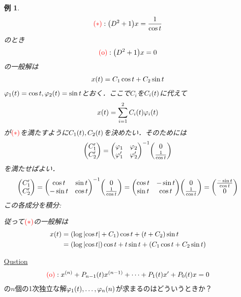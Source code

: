 \documentclass[autodetect-engine,dvipdfmx-if-dvi,ja=standard]{bxjsarticle}
\theoremstyle{mystyle1}
\theoremstyle{mystyle2}
\newtheorem{example}{例}
\newcommand{\redast}{\ensuremath{\color{red}\qty(\ast)\color{black}}}
\newcommand{\redo}{\ensuremath{\color{red}\qty(\textrm{o})\color{black}}}
\begin{document}
\begin{example}
  \begin{align*}
    \redast:\qty(D^2+1)x=\frac{1}{\cos t}
  \end{align*}のとき\begin{align*}
    \redo:\qty(D^2+1)x=0
  \end{align*}の一般解は\begin{align*}
    x\qty(t)=C_1\cos t+C_2\sin t
  \end{align*}$\varphi_1\qty(t)=\cos t,\varphi_2\qty(t)=\sin t$とおく．ここで$C_i$を$C_i\qty(t)$に代えて\begin{align*}
    x\qty(t)=\sum_{i=1}^2C_i\qty(t)\varphi_i\qty(t)
  \end{align*}が\redast を満たすように$C_1\qty(t),C_2\qty(t)$を決めたい．そのためには
  \[\mqty(C_1^\prime  \\C_2^\prime )=\mqty(
    \varphi_1  & \varphi_2  \\
    \varphi_1^\prime & \varphi_2^\prime
    )^{-1}\mqty(0     \\\frac{1}{\cos t})\]
  を満たせばよい．
  \begin{align*}
    \mqty(C_1^\prime  \\C_2^\prime )=\mqty(
    \cos t  & \sin t  \\
    -\sin t & \cos t
    )^{-1}\mqty(0     \\\frac{1}{\cos t})=\mqty(
    \cos t  & -\sin t \\
    \sin t  & \cos t
    )\mqty(0          \\\frac{1}{\cos t})=\mqty(\frac{-\sin t}{\cos t}\\0)
  \end{align*}この各成分を積分:
  従って\redast の一般解は\begin{align*}
    x\qty(t) & =\qty(\log\abs{\cos t}+C_1)\cos t+\qty(t+C_2)\sin t             \\
             & =\qty(\log\abs{\cos t})\cos t+t\sin t+\qty(C_1\cos t+C_2\sin t)
  \end{align*}
\end{example}
\underline{Qustion}\begin{align*}
  \redo:x^{\qty(n)}+P_{n-1}\qty(t)x^{\qty(n-1)}+\cdots+P_1\qty(t)x^\prime +P_0\qty(t)x=0
\end{align*}の$n$個の1次独立な解$\varphi_1\qty(t),\ldots,\varphi_n\qty(n)$が求まるのはどういうときか？\
\end{document}
